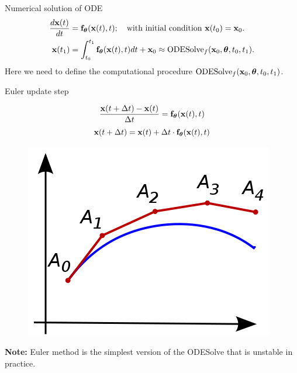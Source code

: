 \begin{frame}{Numerical solution of ODE}
	\vspace{-0.3cm}
	\begin{align*}
		\frac{d \mathbf{x}(t)}{dt} &= \mathbf{f}_{\boldsymbol{\theta}}(\mathbf{x}(t), t); \quad \text{with initial condition }\mathbf{x}(t_0) = \mathbf{x}_0. \\
		\mathbf{x}(t_1) &= \int^{t_1}_{t_0} \mathbf{f}_{\boldsymbol{\theta}}(\mathbf{x}(t), t) d t  + \mathbf{x}_0 \approx \text{ODESolve}_f(\mathbf{x}_0, \boldsymbol{\theta}, t_0, t_1).
	\end{align*}
	Here we need to define the computational procedure $\text{ODESolve}_f(\mathbf{x}_0, \boldsymbol{\theta}, t_0, t_1)$.
	\begin{block}{Euler update step}
		\begin{minipage}[t]{0.6\columnwidth}
			\vspace{-0.5cm}
			\[
	  			\frac{\mathbf{x}(t + \Delta t) - \mathbf{x}(t)}{\Delta t} = \mathbf{f}_{\boldsymbol{\theta}}(\mathbf{x}(t), t)
			\]
			\[
	  			\mathbf{x}(t + \Delta t) = \mathbf{x}(t) + \Delta t \cdot \mathbf{f}_{\boldsymbol{\theta}}(\mathbf{x}(t), t)
			\]
		\end{minipage}%
		\begin{minipage}[t]{0.4\columnwidth}
			\vspace{-0.3cm}
			\begin{figure}
				\centering
				\includegraphics[width=0.7\linewidth]{figs/euler}
			\end{figure}
		\end{minipage}
	\end{block}
	\textbf{Note:} Euler method is the simplest version of the ODESolve that is unstable in practice.
\end{frame}
